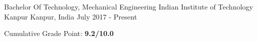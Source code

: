 
\begin{cventries}

  \cventry
    {Bachelor Of Technology, Mechanical Engineering}
    {Indian Institute of Technology Kanpur}
    {Kanpur, India}
    {July 2017 - Present}
    {
      \begin{cvitems}
        \item {Cumulative Grade Point: \textbf{9.2/10.0}}
      \end{cvitems}
    }
  
\end{cventries}

